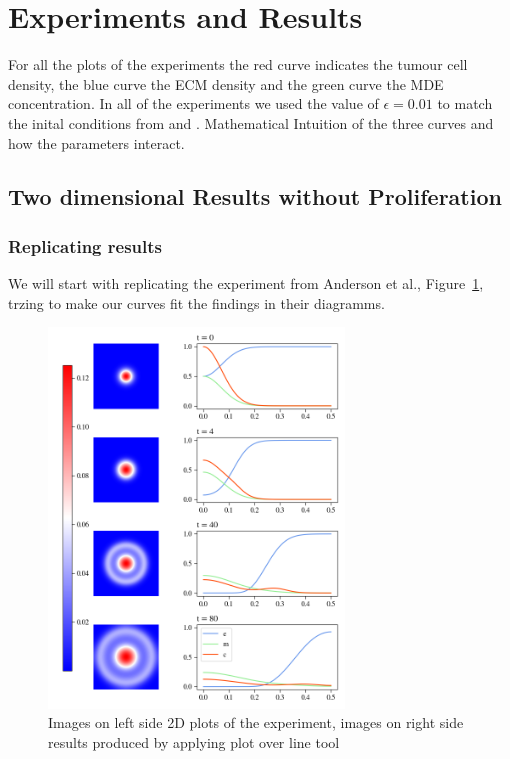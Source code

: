 

\section{Experiments and Results}
For all the plots of the experiments the red curve indicates the tumour cell density, the blue curve the ECM density and the green curve the MDE concentration. In all of the experiments we used the value of $\epsilon = 0.01$ to match the inital conditions from \cite{anderson_mathematical_2000} and \cite{Kolev2010}. \newline 
Mathematical Intuition of the three curves and how the parameters interact.


\subsection{Two dimensional Results without Proliferation}
\subsubsection{Replicating results}
We will start with replicating the experiment from  Anderson et al.\cite{anderson_mathematical_2000}, Figure~\ref{fig:2D_1e-3_1e-3_1e-3_10_0.1_0_0.005}, trzing to make our curves fit the findings in their diagramms. 


\begin{figure}[h]
    \centering
    \includegraphics[width=0.7\textwidth]{resources/images/first_replication_results.png}
    \caption{Images on left side 2D plots of the experiment, images on right side results produced by applying plot over line tool}
    \label{fig:2D_1e-3_1e-3_1e-3_10_0.1_0_0.005}
\end{figure}

